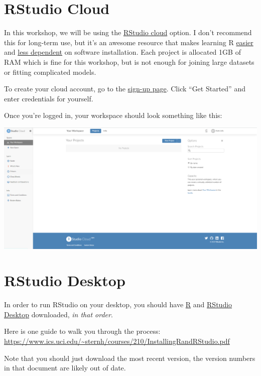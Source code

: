 \documentclass[]{book}
\begin{document}
\section{RStudio Cloud}\label{rstudio-cloud}

In this workshop, we will be using the
\href{https://rstudio.cloud/}{RStudio cloud} option. I don't recommend
this for long-term use, but it's an awesome resource that makes learning
R \href{https://rstudio.cloud/learn/guide}{easier} and
\href{https://www.causeweb.org/cause/sites/default/files/eCOTS\%202018\%20-\%20Frictionless\%20onboarding\%20to\%20data\%20science\%20with\%20RStudio\%20Cloud.pdf}{less
dependent} on software installation. Each project is allocated 1GB of
RAM which is fine for this workshop, but is not enough for joining large
datasets or fitting complicated models.

To create your cloud account, go to the
\href{https://rstudio.cloud/}{sign-up page}. Click ``Get Started'' and
enter credentials for yourself.

Once you're logged in, your workspace should look something like this:

\includegraphics[width=26.67in]{images/rstudiocloud}

\section{RStudio Desktop}\label{rstudio-desktop}

In order to run RStudio on your desktop, you should have
\href{https://cran.r-project.org/mirrors.html}{R} and
\href{https://www.rstudio.com/products/rstudio/download/}{RStudio
Desktop} downloaded, \emph{in that order}.

Here is one guide to walk you through the process:
\url{https://www.ics.uci.edu/~sternh/courses/210/InstallingRandRStudio.pdf}

Note that you should just download the most recent version, the version
numbers in that document are likely out of date.
\end{document}
